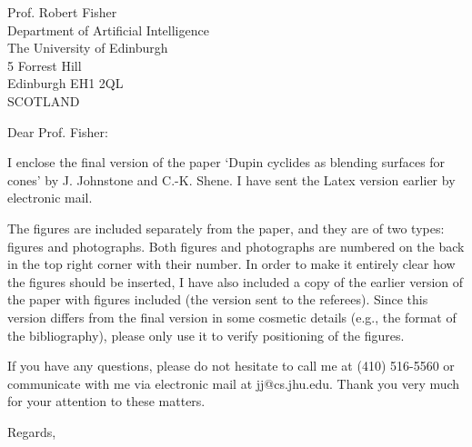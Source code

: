\signature{John K. Johnstone\\jj@cs.jhu.edu}

\begin{letter}
{Prof. Robert Fisher\\
Department of Artificial Intelligence\\
The University of Edinburgh\\
5 Forrest Hill\\
Edinburgh EH1 2QL\\
SCOTLAND
}

\opening{Dear Prof. Fisher:}

I enclose the final version of the paper `Dupin cyclides as blending
surfaces for cones' by J. Johnstone and C.-K. Shene.
I have sent the Latex version earlier by electronic mail.

The figures are included separately from the paper, and they are of
two types: figures and photographs.
Both figures and photographs are numbered on the back in the top right corner 
with their number. 
In order to make it entirely clear how the figures should be inserted,
I have also included a copy of the earlier version of the paper with figures
included (the version sent to the referees).  
Since this version differs from the final version in some cosmetic
details (e.g., the format of the bibliography), please only use it
to verify positioning of the figures.

If you have any questions, please do not hesitate to call me
at (410) 516-5560 or communicate with me via electronic mail
at jj@cs.jhu.edu.
Thank you very much for your attention to these matters.

\closing{Regards,}
\end{letter}

